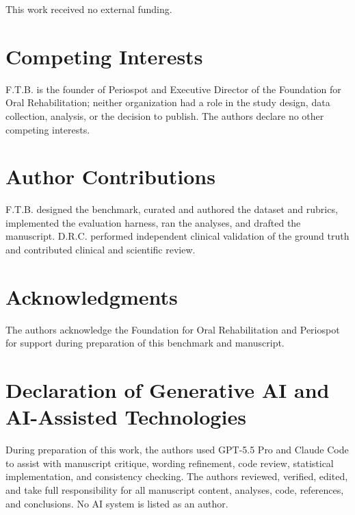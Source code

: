 \documentclass[11pt]{article}
\begin{document}
This work received no external funding.

\section{Competing Interests}

F.T.B. is the founder of Periospot and Executive Director of the Foundation for Oral Rehabilitation; neither organization had a role in the study design, data collection, analysis, or the decision to publish. The authors declare no other competing interests.

\section{Author Contributions}

F.T.B. designed the benchmark, curated and authored the dataset and rubrics, implemented the evaluation harness, ran the analyses, and drafted the manuscript. D.R.C. performed independent clinical validation of the ground truth and contributed clinical and scientific review.

\section{Acknowledgments}

The authors acknowledge the Foundation for Oral Rehabilitation and Periospot for support during preparation of this benchmark and manuscript.

\section{Declaration of Generative AI and AI-Assisted Technologies}

During preparation of this work, the authors used GPT-5.5 Pro and Claude Code to assist with manuscript critique, wording refinement, code review, statistical implementation, and consistency checking. The authors reviewed, verified, edited, and take full responsibility for all manuscript content, analyses, code, references, and conclusions. No AI system is listed as an author.
\end{document}
